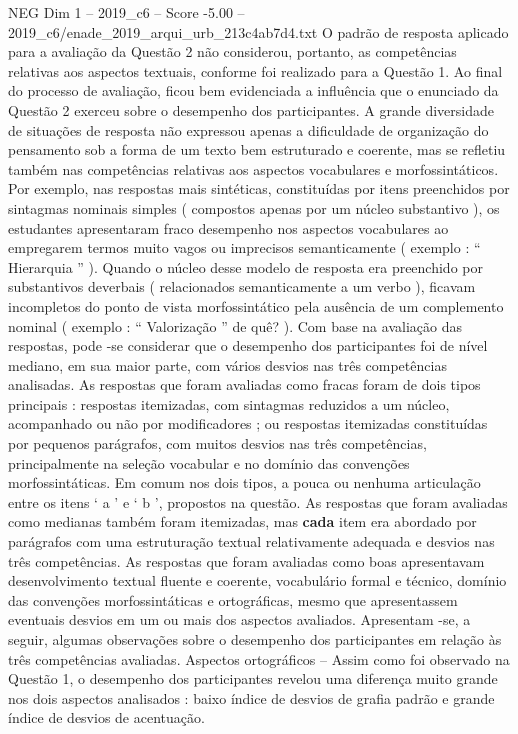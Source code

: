 \begin{textsample}{NEG Dim 1 – 2019\_c6 – Score -5.00 – 2019\_c6/enade\_2019\_arqui\_urb\_213c4ab7d4.txt}
O padrão de resposta aplicado para a avaliação da Questão 2 não considerou, portanto, as competências relativas aos aspectos textuais, conforme foi realizado para a Questão 1.
Ao final do processo de avaliação, ficou bem evidenciada a influência que o enunciado da Questão 2 exerceu sobre o desempenho dos participantes.
A grande diversidade de situações de resposta não expressou apenas a dificuldade de organização do pensamento sob a forma de um texto bem estruturado e coerente, mas se refletiu também nas competências relativas aos aspectos vocabulares e morfossintáticos.
Por exemplo, nas respostas mais sintéticas, constituídas por itens preenchidos por sintagmas nominais simples ( compostos apenas por um núcleo substantivo ), os estudantes apresentaram fraco desempenho nos aspectos vocabulares ao empregarem termos muito vagos ou imprecisos semanticamente ( exemplo : “ Hierarquia ” ).
Quando o núcleo desse modelo de resposta era preenchido por substantivos deverbais ( relacionados semanticamente a um verbo ), ficavam incompletos do ponto de vista morfossintático pela ausência de um complemento nominal ( exemplo : “ Valorização ” de quê? ).
Com base na avaliação das respostas, pode -se considerar que o desempenho dos participantes foi de nível mediano, em sua maior parte, com vários desvios nas três competências analisadas.
As respostas que foram avaliadas como fracas foram de dois tipos principais : respostas itemizadas, com sintagmas reduzidos a um núcleo, acompanhado ou não por modificadores ; ou respostas itemizadas constituídas por pequenos parágrafos, com muitos desvios nas três competências, principalmente na seleção vocabular e no domínio das convenções morfossintáticas.
Em comum nos dois tipos, a pouca ou nenhuma articulação entre os itens ‘ a ’ e ‘ b ’, propostos na questão.
As respostas que foram avaliadas como medianas também foram itemizadas, mas \textbf{cada} item era abordado por parágrafos com uma estruturação textual relativamente adequada e desvios nas três competências.
As respostas que foram avaliadas como boas apresentavam desenvolvimento textual fluente e coerente, vocabulário formal e técnico, domínio das convenções morfossintáticas e ortográficas, mesmo que apresentassem eventuais desvios em um ou mais dos aspectos avaliados.
Apresentam -se, a seguir, algumas observações sobre o desempenho dos participantes em relação às três competências avaliadas.
Aspectos ortográficos – Assim como foi observado na Questão 1, o desempenho dos participantes revelou uma diferença muito grande nos dois aspectos analisados : baixo índice de desvios de grafia padrão e grande índice de desvios de acentuação.

\end{textsample}
